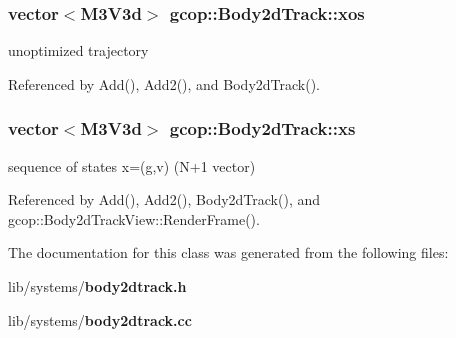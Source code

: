 \subsubsection[{xos}]{\setlength{\rightskip}{0pt plus 5cm}vector$<${\bf \-M3\-V3d}$>$ {\bf gcop\-::\-Body2d\-Track\-::xos}}\label{classgcop_1_1Body2dTrack_a037e27565b3c35c4585052b0e8de26ab}


unoptimized trajectory 



\-Referenced by \-Add(), \-Add2(), and \-Body2d\-Track().

\subsubsection[{xs}]{\setlength{\rightskip}{0pt plus 5cm}vector$<${\bf \-M3\-V3d}$>$ {\bf gcop\-::\-Body2d\-Track\-::xs}}\label{classgcop_1_1Body2dTrack_a33335be53322b6aab899874f66e2a10d}


sequence of states x=(g,v) (\-N+1 vector) 



\-Referenced by \-Add(), \-Add2(), \-Body2d\-Track(), and gcop\-::\-Body2d\-Track\-View\-::\-Render\-Frame().



\-The documentation for this class was generated from the following files\-:\begin{DoxyCompactItemize}
\item 
lib/systems/{\bf body2dtrack.\-h}\item 
lib/systems/{\bf body2dtrack.\-cc}\end{DoxyCompactItemize}
